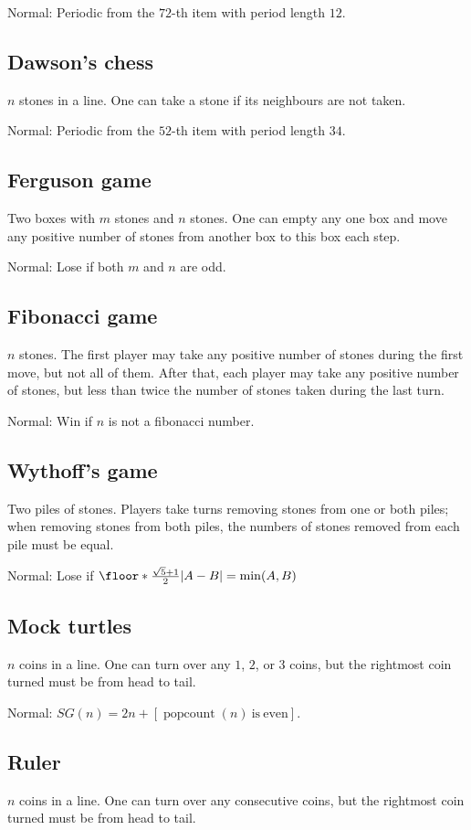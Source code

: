 Normal: Periodic from the $72$-th item with period length $12$.

\subsection{Dawson's chess}
$n$ stones in a line. One can take a stone if its neighbours are not taken.

Normal: Periodic from the $52$-th item with period length $34$.

\subsection{Ferguson game}
Two boxes with $m$ stones and $n$ stones. One can empty any one box and move any positive number of stones from another box to this box each step.

Normal: Lose if both $m$ and $n$ are odd.

\subsection{Fibonacci game}
$n$ stones. The first player may take any positive number of stones during the first move, but not all of them. After that, each player may take any positive number of stones, but less than twice the number of stones taken during the last turn.

Normal: Win if $n$ is not a fibonacci number.

\subsection{Wythoff's game}
Two piles of stones. Players take turns removing stones from one or both piles; when removing stones from both piles, the numbers of stones removed from each pile must be equal.

Normal: Lose if $\floor*{\frac{\sqrt{5}+1}{2}|A-B|}=\min(A,B)$

\subsection{Mock turtles}
$n$ coins in a line. One can turn over any $1$, $2$, or $3$ coins, but the rightmost coin turned must be from head to tail.

Normal: $SG(n)=2n+[\operatorname{popcount}(n)\mathrm{\ is\ even}]$.

\subsection{Ruler}
$n$ coins in a line. One can turn over any consecutive coins, but the rightmost coin turned must be from head to tail.

